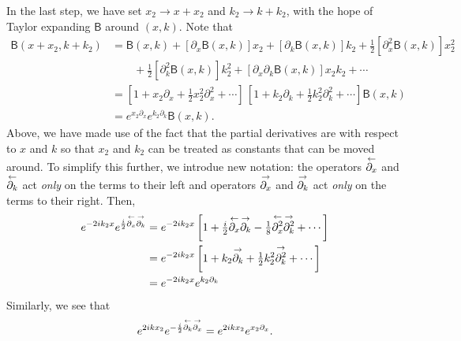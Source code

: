 %
In the last step, we have set $x_{2} \to x + x_{2}$ and $k_{2} \to k + k_{2}$, with the hope of Taylor expanding $\mathsf{B}$ around $(x, k)$.
Note that
%
\begin{equation}
  \begin{aligned}
    \mathsf{B}(x + x_{2}, k + k_{2}) &= \mathsf{B}(x, k) + [\partial_{x} \mathsf{B}(x, k)]x_{2} + [\partial_{k} \mathsf{B}(x, k)] k_{2} + \tfrac{1}{2} [\partial^{2}_{x} \mathsf{B}(x, k)] x_{2}^{2}\\
    &\qquad + \tfrac{1}{2} [\partial^{2}_{k} \mathsf{B}(x, k)] k_{2}^{2} + [\partial_{x}\partial_{k} \mathsf{B}(x, k)] x_{2}k_{2} + \cdots \\
    &= \left[1 + x_{2}\partial_{x} + \tfrac{1}{2}x_{2}^{2}\partial^{2}_{x} + \cdots \right]\,
  \left[1 + k_{2}\partial_{k} + \tfrac{1}{2}k_{2}^{2}\partial^{2}_{k} + \cdots \right] \mathsf{B}(x, k)\\
    &= e^{x_{2}\partial_{x}} e^{k_{2}\partial_{k}} \mathsf{B}(x, k).\label{eq:moyal2}
  \end{aligned}
\end{equation}
%
Above, we have made use of the fact that the partial derivatives are with respect to $x$ and $k$ so that $x_{2}$ and $k_{2}$ can be treated as constants that can be moved around.
To simplify this further, we introdue new notation: the operators $\overset{\gets}{\partial_{x}}$ and $\overset{\gets}{\partial_{k}}$ act \emph{only} on the terms to their left and operators $\overset{\to}{\partial_{x}}$ and $\overset{\to}{\partial_{k}}$ act \emph{only} on the terms to their right.
Then,
%
\begin{equation}
  \begin{aligned}
    e^{-2ik_{2}x} e^{\frac{i}{2}\overset{\gets}{\partial_{x}}\overset{\to}{\partial_{k}}} &= e^{-2ik_{2}x} \left[1 +  \tfrac{i}{2}\overset{\gets}{\partial_{x}}\overset{\to}{\partial_{k}} - \tfrac{1}{8}\overset{\gets}{\partial^{2}_{x}}\overset{\to}{\partial^{2}_{k}} + \cdots \right]\\
                                                            &= e^{-2ik_{2}x} \left[1 +  k_{2}\overset{\to}{\partial_{k}} + \tfrac{1}{2}k_{2}^{2}\overset{\to}{\partial^{2}_{k}} + \cdots \right]\\
                                                            &= e^{-2ik_{2}x}e^{k_{2}\partial_{k}}
  \end{aligned}\label{eq:moyal3}
\end{equation}
%
Similarly, we see that
%
\begin{equation}
  e^{2ikx_{2}}e^{-\frac{i}{2}\overset{\gets}{\partial_{k}}\overset{\to}{\partial_{x}}} = e^{2ikx_{2}}e^{x_{2}\partial_{x}}.\label{eq:moyal4}
\end{equation}

